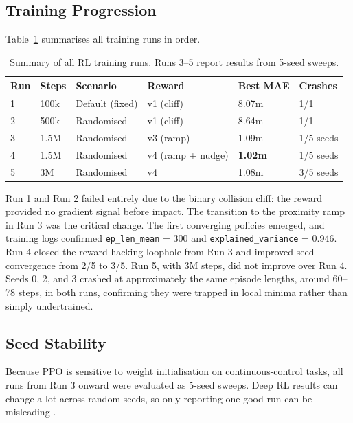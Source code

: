\documentclass{article}
\begin{document}
\subsection*{Training Progression}

Table~\ref{tab:run_history} summarises all training runs in order.

\begin{table}[h]
\centering
\begin{tabular}{llllll}
\toprule
Run & Steps & Scenario & Reward & Best MAE & Crashes \\
\midrule
1 & 100k  & Default (fixed) & v1 (cliff) & 8.07m & 1/1 \\
2 & 500k  & Randomised & v1 (cliff) & 8.64m & 1/1 \\
3 & 1.5M  & Randomised & v3 (ramp) & 1.09m & 1/5 seeds \\
4 & 1.5M  & Randomised & v4 (ramp + nudge) & \textbf{1.02m} & 1/5 seeds \\
5 & 3M    & Randomised & v4 & 1.08m & 3/5 seeds \\
\bottomrule
\end{tabular}
\caption{Summary of all RL training runs. Runs 3--5 report results from 5-seed sweeps.}
\label{tab:run_history}
\end{table}

Run 1 and Run 2 failed entirely due to the binary collision cliff: the reward provided no gradient signal before impact. The transition to the proximity ramp in Run 3 was the critical change. The first converging policies emerged, and training logs confirmed \texttt{ep\_len\_mean} = 300 and \texttt{explained\_variance} = 0.946. Run 4 closed the reward-hacking loophole from Run 3 and improved seed convergence from 2/5 to 3/5. Run 5, with 3M steps, did not improve over Run 4. Seeds 0, 2, and 3 crashed at approximately the same episode lengths, around 60--78 steps, in both runs, confirming they were trapped in local minima rather than simply undertrained.

\subsection*{Seed Stability}

Because PPO is sensitive to weight initialisation on continuous-control tasks, all runs from Run 3 onward were evaluated as 5-seed sweeps. Deep RL results can change a lot across random seeds, so only reporting one good run can be misleading \cite{henderson2018matters}.
\end{document}

